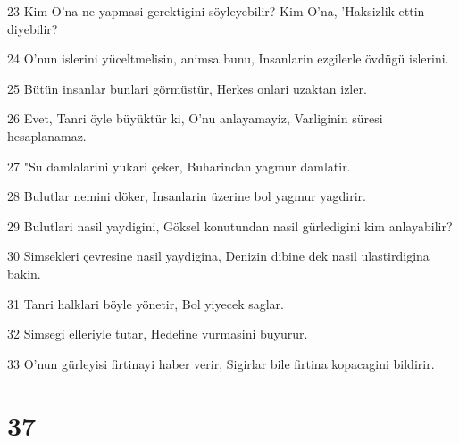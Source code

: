 \par 23 Kim O'na ne yapmasi gerektigini söyleyebilir? Kim O'na, 'Haksizlik ettin diyebilir?
\par 24 O'nun islerini yüceltmelisin, animsa bunu, Insanlarin ezgilerle övdügü islerini.
\par 25 Bütün insanlar bunlari görmüstür, Herkes onlari uzaktan izler.
\par 26 Evet, Tanri öyle büyüktür ki, O'nu anlayamayiz, Varliginin süresi hesaplanamaz.
\par 27 "Su damlalarini yukari çeker, Buharindan yagmur damlatir.
\par 28 Bulutlar nemini döker, Insanlarin üzerine bol yagmur yagdirir.
\par 29 Bulutlari nasil yaydigini, Göksel konutundan nasil gürledigini kim anlayabilir?
\par 30 Simsekleri çevresine nasil yaydigina, Denizin dibine dek nasil ulastirdigina bakin.
\par 31 Tanri halklari böyle yönetir, Bol yiyecek saglar.
\par 32 Simsegi elleriyle tutar, Hedefine vurmasini buyurur.
\par 33 O'nun gürleyisi firtinayi haber verir, Sigirlar bile firtina kopacagini bildirir.

\chapter{37}

